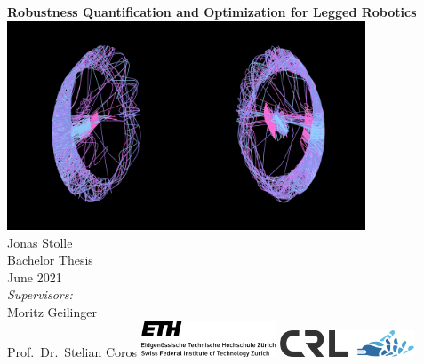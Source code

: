 \documentclass[a4paper,twoside,12pt,nochapterprefix]{scrbook}
\begin{document}
%


\newcommand{\mfytext}[0]{my fancy text}

\newcommand{\chpref}[1]{Chapter \ref{#1}}
\newcommand{\secref}[1]{Section \ref{#1}}
\newcommand{\figref}[1]{Figure \ref{#1}}
\newcommand{\tabref}[1]{Table \ref{#1}}
\newcommand{\apxref}[1]{Appendix \ref{#1}}

%
\begin{titlepage}
	\topmargin 1.0cm
	\oddsidemargin 0.0cm
	\evensidemargin 0.0cm
	\centering
	\Huge
	\vspace{3.0cm}
	\textbf{\textsf{Robustness Quantification and Optimization for Legged Robotics}} \\[2.0cm]
	\includegraphics*[width=0.8\textwidth]{figures/colors_on_black.png} \\ %
	\vspace{3cm}
	\sffamily
	\Large
	Jonas Stolle
	\\[0.8cm]
	\large
	Bachelor Thesis %
	\\
	June 2021
	\\[1.3cm]
	\emph{Supervisors:}\\
	Moritz Geilinger\\ 					%
	Prof.\ Dr.\ Stelian Coros		%
	\vfill
	\includegraphics*[width=0.3\textwidth]{figures/ETH_logo} \hfill
	\includegraphics*[width=0.3\textwidth]{figures/CRL-logo}
	\vspace{3.4cm}
\end{titlepage}
\clearemptydoublepage
\end{document}

